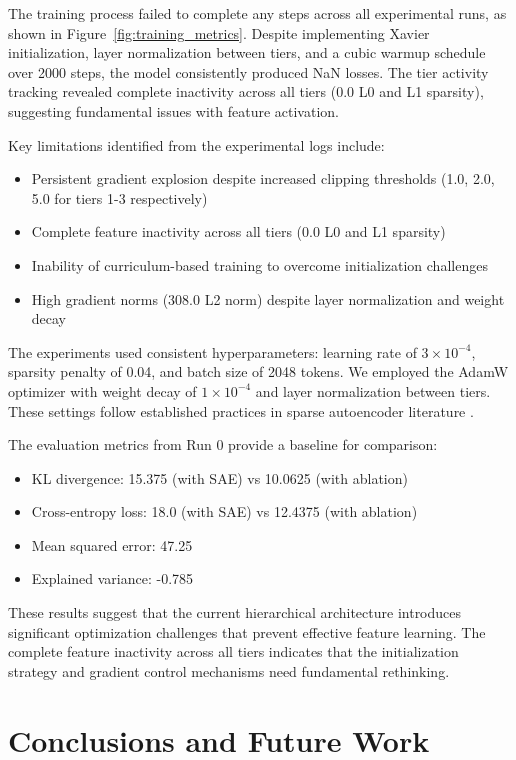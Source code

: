 \documentclass{article} %
\begin{document}
The training process failed to complete any steps across all experimental runs, as shown in Figure~\ref{fig:training_metrics}. Despite implementing Xavier initialization, layer normalization between tiers, and a cubic warmup schedule over 2000 steps, the model consistently produced NaN losses. The tier activity tracking revealed complete inactivity across all tiers (0.0 L0 and L1 sparsity), suggesting fundamental issues with feature activation.

Key limitations identified from the experimental logs include:
\begin{itemize}
    \item Persistent gradient explosion despite increased clipping thresholds (1.0, 2.0, 5.0 for tiers 1-3 respectively)
    \item Complete feature inactivity across all tiers (0.0 L0 and L1 sparsity)
    \item Inability of curriculum-based training to overcome initialization challenges
    \item High gradient norms (308.0 L2 norm) despite layer normalization and weight decay
\end{itemize}

The experiments used consistent hyperparameters: learning rate of $3 \times 10^{-4}$, sparsity penalty of 0.04, and batch size of 2048 tokens. We employed the AdamW optimizer with weight decay of $1 \times 10^{-4}$ and layer normalization between tiers. These settings follow established practices in sparse autoencoder literature \cite{goodfellow2016deep}.

The evaluation metrics from Run 0 provide a baseline for comparison:
\begin{itemize}
    \item KL divergence: 15.375 (with SAE) vs 10.0625 (with ablation)
    \item Cross-entropy loss: 18.0 (with SAE) vs 12.4375 (with ablation)
    \item Mean squared error: 47.25
    \item Explained variance: -0.785
\end{itemize}

These results suggest that the current hierarchical architecture introduces significant optimization challenges that prevent effective feature learning. The complete feature inactivity across all tiers indicates that the initialization strategy and gradient control mechanisms need fundamental rethinking.

\section{Conclusions and Future Work}
\label{sec:conclusion}
\end{document}
